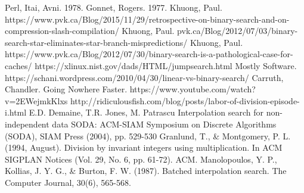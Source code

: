 \documentclass[twocolumn]{article}
\begin{document}
\onecolumn
\begin{thebibliography}{1}
 Perl, Itai, Avni. 1978.
 Gonnet, Rogers. 1977.
 Khuong, Paul. https://www.pvk.ca/Blog/2015/11/29/retrospective-on-binary-search-and-on-compression-slash-compilation/
 Khuong, Paul. pvk.ca/Blog/2012/07/03/binary-search-star-eliminates-star-branch-mispredictions/
 Khuong, Paul. https://www.pvk.ca/Blog/2012/07/30/binary-search-is-a-pathological-case-for-caches/
 https://xlinux.nist.gov/dads/HTML/jumpsearch.html
 Mostly Software. https://schani.wordpress.com/2010/04/30/linear-vs-binary-search/
 Carruth, Chandler. Going Nowhere Faster. https://www.youtube.com/watch?v=2EWejmkKlxs
 http://ridiculousfish.com/blog/posts/labor-of-division-episode-i.html
 E.D. Demaine, T.R. Jones, M. Patrascu Interpolation search for non-independent data SODA: ACM-SIAM Symposium on Discrete Algorithms (SODA), SIAM Press (2004), pp. 529-530
 Granlund, T., \& Montgomery, P. L. (1994, August). Division by invariant integers using multiplication. In ACM SIGPLAN Notices (Vol. 29, No. 6, pp. 61-72). ACM.
 Manolopoulos, Y. P., Kollias, J. Y. G., \& Burton, F. W. (1987). Batched interpolation search. The Computer Journal, 30(6), 565-568.
\end{thebibliography}
\end{document}
